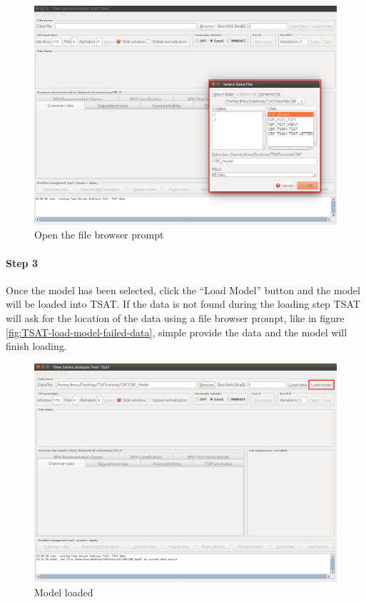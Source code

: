 \documentclass[letterpaper, 12pt]{article}
\begin{document}
\begin{figure}[H]
	\includegraphics[width=\textwidth]{TSAT-load-model-step-2}
	\caption{Open the file browser prompt}
	\label{fig:TSAT-load-model-step-2}
\end{figure}

\newpage
\paragraph{Step 3}
Once the model has been selected, click the ``Load Model'' button and the model will be loaded into TSAT. If the data is not found during the loading step TSAT will ask for the location of the data using a file browser prompt, like in figure \ref{fig:TSAT-load-model-failed-data}, simple provide the data and the model will finish loading. 

\begin{figure}[H]
	\includegraphics[width=\textwidth]{TSAT-load-model-step-3}
	\caption{Model loaded}
	\label{fig:TSAT-load-model-step-3}
\end{figure}
\end{document}
